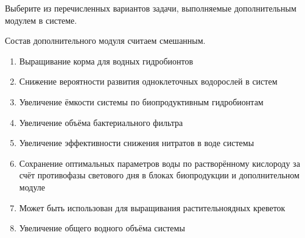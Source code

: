 
Выберите из перечисленных вариантов задачи, выполняемые дополнительным модулем в системе.

Состав дополнительного модуля считаем смешанным.

\begin{enumerate}
    \item Выращивание корма для водных гидробионтов
    \item Снижение вероятности развития одноклеточных водорослей в систем
    \item Увеличение ёмкости системы по биопродуктивным гидробионтам
    \item Увеличение объёма бактериального фильтра
    \item Увеличение эффективности снижения нитратов в воде системы
    \item Сохранение оптимальных параметров воды по растворённому кислороду за счёт противофазы светового дня в блоках биопродукции и дополнительном модуле
    \item Может быть использован для выращивания растительноядных креветок
    \item Увеличение общего водного объёма системы
\end{enumerate}

